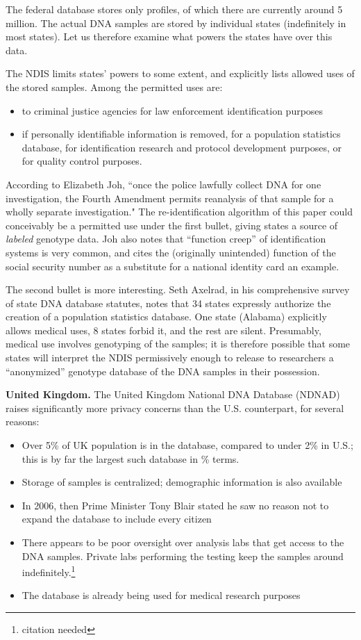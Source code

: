 \documentclass{article}
\begin{document}
The federal database stores only profiles, of which there are currently around 5 million. The actual DNA samples are stored by individual states (indefinitely in most states). Let us therefore examine what powers the states have over this data.

The NDIS limits states' powers to some extent, and explicitly lists allowed uses of the stored samples. Among the permitted uses are:
\begin{itemize}
\item
to criminal justice agencies for law enforcement identification purposes
\item
if personally identifiable information is removed, for a population statistics database, for identification research and protocol development purposes, or for quality control purposes.
\end{itemize}

According to Elizabeth Joh, ``once the police lawfully collect DNA for one investigation, the Fourth Amendment permits reanalysis of that sample for a wholly separate investigation." The re-identification algorithm of this paper could conceivably be a permitted use under the first bullet, giving states a source of {\em labeled} genotype data. Joh also notes that ``function creep'' of identification systems is very common, and cites the (originally unintended) function of the social security number as a substitute for a national identity card an example.

The second bullet is more interesting. Seth Axelrad, in his comprehensive survey of state DNA database statutes, notes that 34 states expressly authorize the creation of a population statistics database. One state (Alabama) explicitly allows medical uses, 8 states forbid it, and the rest are silent. Presumably, medical use involves genotyping of the samples; it is therefore possible that some states will interpret the NDIS permissively enough to release to researchers a ``anonymized'' genotype database of the DNA samples in their possession.

{\bf United Kingdom.} 
The United Kingdom National DNA Database (NDNAD) raises significantly more privacy concerns than the U.S. counterpart, for several reasons:
\begin{itemize}
\item Over 5\% of UK population is in the database, compared to under 2\% in U.S.; this is by far the largest such database in \% terms.
\item Storage of samples is centralized; demographic information is also available
\item In 2006, then Prime Minister Tony Blair stated he saw no reason not to expand the database to include every citizen
\item There appears to be poor oversight over analysis labs that get access to the DNA samples. Private labs performing the testing keep the samples around indefinitely.\footnote{citation needed}
\item The database is already being used for medical research purposes
\end{itemize}
\end{document}
